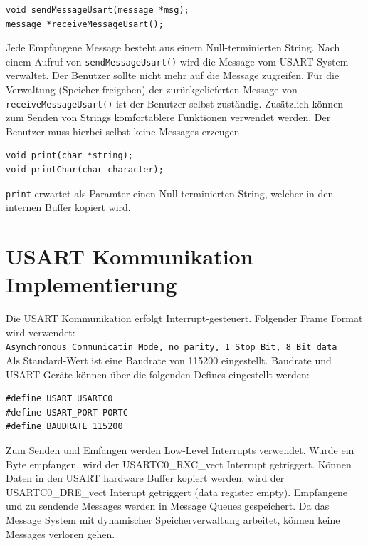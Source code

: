 \documentclass[fontsize=12pt, toc=bibliography, notitlepage]{scrreprt}
\begin{document}
\begin{lstlisting}
void sendMessageUsart(message *msg);
message *receiveMessageUsart();
\end{lstlisting}

Jede Empfangene Message besteht aus einem Null-terminierten String. Nach einem Aufruf von \lstinline$sendMessageUsart()$ wird die Message vom USART System verwaltet. Der Benutzer sollte nicht mehr auf die Message zugreifen. Für die Verwaltung (Speicher freigeben) der zurückgelieferten Message von \lstinline$receiveMessageUsart()$ ist der Benutzer selbst zuständig. Zusätzlich können zum Senden von Strings komfortablere Funktionen verwendet werden. Der Benutzer muss hierbei selbst keine Messages erzeugen.\\

\begin{lstlisting}
void print(char *string);
void printChar(char character);
\end{lstlisting}

\lstinline$print$ erwartet als Paramter einen Null-terminierten String, welcher in den internen Buffer kopiert wird.

\section{USART Kommunikation Implementierung}
\label{subsec:shell-communication-impl}
Die USART Kommunikation erfolgt Interrupt-gesteuert. Folgender Frame Format wird verwendet:\\

\lstinline$Asynchronous Communicatin Mode, no parity, 1 Stop Bit, 8 Bit data$\\

Als Standard-Wert ist eine Baudrate von 115200 eingestellt. Baudrate und USART Geräte können über die folgenden Defines eingestellt werden:\\

\begin{lstlisting}
#define USART USARTC0
#define USART_PORT PORTC
#define BAUDRATE 115200
\end{lstlisting}

Zum Senden und Emfangen werden Low-Level Interrupts verwendet. Wurde ein Byte empfangen, wird der USARTC0\_RXC\_vect Interrupt getriggert. Können Daten in den USART hardware Buffer kopiert werden, wird der USARTC0\_DRE\_vect Interupt getriggert (data register empty). Empfangene und zu sendende Messages werden in Message Queues gespeichert. Da das Message System mit dynamischer Speicherverwaltung arbeitet, können keine Messages verloren gehen.\\
\end{document}
